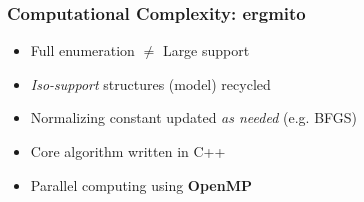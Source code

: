 \documentclass[aspectratio=169, 9pt, handout]{beamer}
\begin{document}
\begin{frame}
	\frametitle{Computational Complexity: ergmito}
	\begin{minipage}[m]{.4\linewidth}
		\begin{itemize}
			\item<2-> Full enumeration $\neq$ Large support
		\end{itemize}
		\begin{itemize}
			\item<4-> \textit{Iso-support} structures (model) recycled
			\item<5-> Normalizing constant updated \textit{as needed} (e.g. BFGS)
			\item<6-> Core algorithm written in C++
			\item<7-> Parallel computing using \textbf{OpenMP}
		\end{itemize}
	\end{minipage}\hfill
	\begin{minipage}[m]{.59\linewidth}
	\centering
	\end{minipage}
\end{frame}



\end{document}
